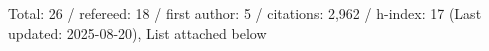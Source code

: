 Total: 26 / refereed: 18 / first author: 5 / citations: 2,962 / h-index: 17 (Last updated: 2025-08-20), List attached below